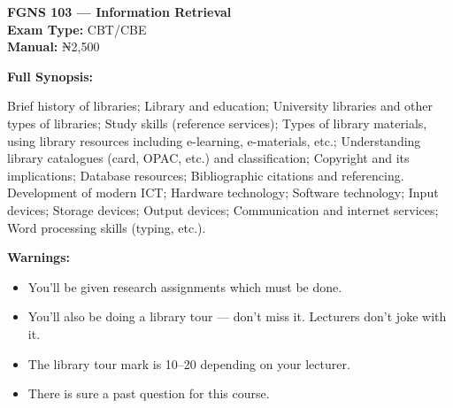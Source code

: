 \documentclass[11pt,a4paper]{article}
\begin{document}
\begin{coursebox}
    \textbf{\color{primary}\Large FGNS 103 --- Information Retrieval}\\
    \textbf{Exam Type:} CBT/CBE \\
    \textbf{Manual:} ₦2,500

    \vspace{0.8em}

    \textbf{Full Synopsis:}

    Brief history of libraries; Library and education; University libraries and other types of libraries; Study skills (reference services); Types of library materials, using library resources including e-learning, e-materials, etc.; Understanding library catalogues (card, OPAC, etc.) and classification; Copyright and its implications; Database resources; Bibliographic citations and referencing. Development of modern ICT; Hardware technology; Software technology; Input devices; Storage devices; Output devices; Communication and internet services; Word processing skills (typing, etc.).

    \vspace{0.8em}

    \textbf{\color{warningText}Warnings:}
    \begin{itemize}[leftmargin=1.5em, itemsep=0.2em]
        \item You'll be given research assignments which must be done.
        \item You'll also be doing a library tour --- don't miss it. Lecturers don't joke with it.
        \item The library tour mark is 10--20 depending on your lecturer.
        \item There is sure a past question for this course.
    \end{itemize}
\end{coursebox}
\end{document}
